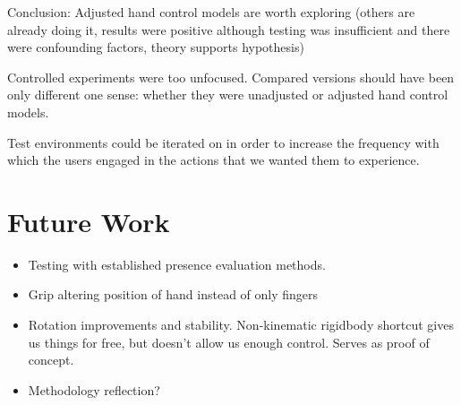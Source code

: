 Conclusion: Adjusted hand control models are worth exploring (others are already doing it, results were positive although testing was insufficient and there were confounding factors, theory supports hypothesis)

Controlled experiments were too unfocused. Compared versions should have been only different one sense: whether they were unadjusted or adjusted hand control models.

Test environments could be iterated on in order to increase the frequency with which the users engaged in the actions that we wanted them to experience.

\section{Future Work}
\label{sec:futureWork}

\begin{itemize}
\item Testing with established presence evaluation methods.
\item Grip altering position of hand instead of only fingers
\item Rotation improvements and stability. Non-kinematic rigidbody shortcut gives us things for free, but doesn't allow us enough control. Serves as proof of concept.
\item Methodology reflection?
\end{itemize}